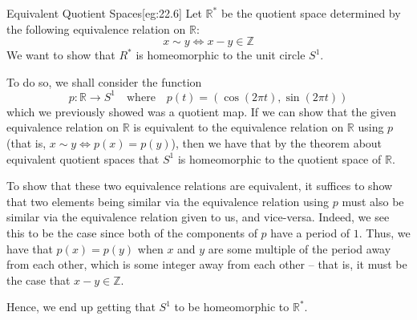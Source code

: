 \begin{egBox}{Equivalent Quotient Spaces}[eg:22.6]
    Let \( \mathbb{R}^{ * } \) be the quotient space determined by the following
    equivalence relation on \( \mathbb{R} \):
    \begin{equation*}
        x \sim y
        \iff 
        x - y \in \mathbb{Z}
    \end{equation*}
    We want to show that \( R^{ * } \) is homeomorphic to the unit circle 
    \( S^{ 1 } \).

    \baseSkip

    To do so, we shall consider the function
    \begin{equation*}
        p: \mathbb{R} \rightarrow S^{ 1 }
        \quad \mathrm{where} \quad 
        p ( t )
        =
        ( \cos ( 2 \pi t ), \sin ( 2 \pi t ) )
    \end{equation*}
    which we previously showed was a quotient map.
    If we can show that the given equivalence relation on \( \mathbb{R} \)
    is equivalent to the equivalence relation on \( \mathbb{R} \) using \( p \)
    (that is, \( x \sim y \iff p ( x ) = p ( y ) \)),
    then we have that by the theorem about equivalent quotient spaces that 
    \( S^{ 1 } \) is homeomorphic to the quotient space of \( \mathbb{R} \).

    \baseSkip

    To show that these two equivalence relations are equivalent, it suffices to
    show that two elements being similar via the equivalence relation using
    \( p \) must also be similar via the equivalence relation given to us, and 
    vice-versa. 
    Indeed, we see this to be the case since both of the components of \( p \) 
    have a period of \( 1 \).
    Thus, we have that \( p ( x ) = p ( y ) \) when \( x \) and \( y \) are some
    multiple of the period away from each other, which is some integer away 
    from each other -- that is, it must be the case that \( x - y \in 
    \mathbb{Z} \).

    \baseSkip

    Hence, we end up getting that \( S^{ 1 } \) to be homeomorphic to 
    \( \mathbb{R}^{ * } \).
\end{egBox}

